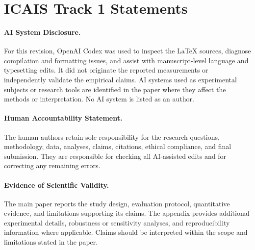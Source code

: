 \section*{ICAIS Track 1 Statements}

\paragraph{AI System Disclosure.}
For this revision, OpenAI Codex was used to inspect the LaTeX sources,
diagnose compilation and formatting issues, and assist with manuscript-level
language and typesetting edits. It did not originate the reported
measurements or independently validate the empirical claims. AI systems used
as experimental subjects or research tools are identified in the paper where
they affect the methods or interpretation. No AI system is listed as an
author.

\paragraph{Human Accountability Statement.}
The human authors retain sole responsibility for the research questions,
methodology, data, analyses, claims, citations, ethical compliance, and final
submission. They are responsible for checking all AI-assisted edits and for
correcting any remaining errors.

\paragraph{Evidence of Scientific Validity.}
The main paper reports the study design, evaluation protocol, quantitative
evidence, and limitations supporting its claims. The appendix provides
additional experimental details, robustness or sensitivity analyses, and
reproducibility information where applicable. Claims should be interpreted
within the scope and limitations stated in the paper.
